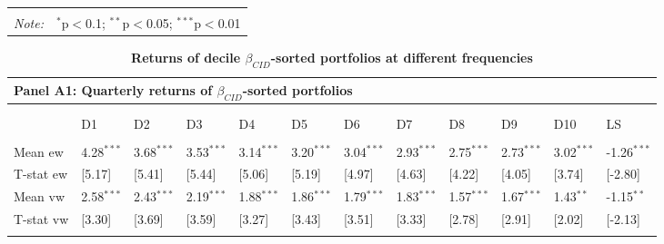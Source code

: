 \documentclass[12pt]{article}
\begin{document}
\begin{table}[!htbp]
\begin{tabular}{@{\extracolsep{5pt}}lcccccc}
\hline 
\hline \\[-1.8ex] 
\textit{Note:}  & \multicolumn{6}{r}{$^{*}$p$<$0.1; $^{**}$p$<$0.05; $^{***}$p$<$0.01} \\ 
\end{tabular} 
\end{table} 





\begin{table}[!htbp] \centering 
  \caption{\textbf{Returns of decile $\beta_{CID}$-sorted portfolios at different frequencies}} 
  \label{} 
  
\begin{tabularx}{\linewidth}{p{1.75cm}p{1cm}p{1cm}p{1cm}p{1cm}p{1cm}p{1cm}p{1cm}p{1cm}p{1cm}p{1cm}p{3cm}}
    \toprule
    \multicolumn{12}{l}{\textbf{Panel A1: Quarterly returns of $\beta_{CID}$-sorted portfolios}} \\
    \midrule
\\[-1.8ex]\hline 
\hline \\[-1.8ex] 
 & D1 & D2 & D3 & D4 & D5 & D6 & D7 & D8 & D9 & D10 & LS \\ 
\hline \\[-1.8ex] 
Mean ew & 4.28$^{***}$ & 3.68$^{***}$ & 3.53$^{***}$ & 3.14$^{***}$ & 3.20$^{***}$ & 3.04$^{***}$ & 2.93$^{***}$ & 2.75$^{***}$ & 2.73$^{***}$ & 3.02$^{***}$ & -1.26$^{***}$ \\ 
T-stat ew & [5.17] & [5.41] & [5.44] & [5.06] & [5.19] & [4.97] & [4.63] & [4.22] & [4.05] & [3.74] & [-2.80] \\ 
Mean vw & 2.58$^{***}$ & 2.43$^{***}$ & 2.19$^{***}$ & 1.88$^{***}$ & 1.86$^{***}$ & 1.79$^{***}$ & 1.83$^{***}$ & 1.57$^{***}$ & 1.67$^{***}$ & 1.43$^{**}$ & -1.15$^{**}$ \\ 
T-stat vw & [3.30] & [3.69] & [3.59] & [3.27] & [3.43] & [3.51] & [3.33] & [2.78] & [2.91] & [2.02] & [-2.13] \\ 
\hline \\[-1.8ex] 
\end{tabularx} 
 


\end{table}
\end{document}
